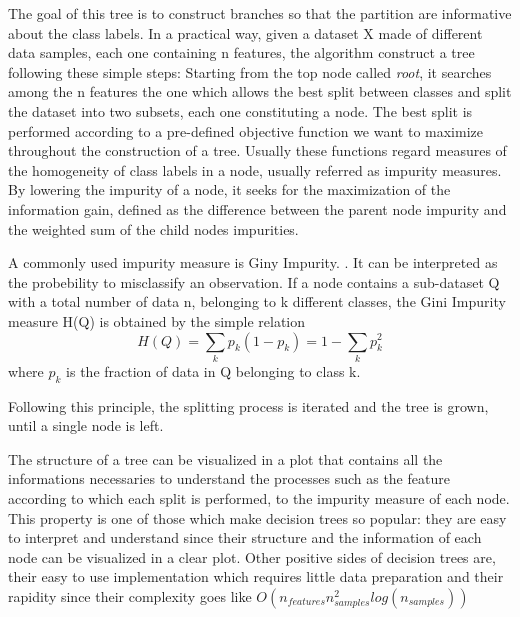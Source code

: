\documentclass[11pt]{report}
\begin{document}
The goal of this tree is to construct branches so that the partition are informative about the class labels.
In a practical way, given a dataset X made of different data samples, each one containing n features, the algorithm construct a tree following these simple steps:
Starting from the top node called \emph{root}, it searches among the n features the one which allows the best split between classes and split the dataset into two subsets, each one constituting a node.
The best split is performed according to a pre-defined objective function we want to maximize throughout the construction of a tree.
Usually these functions regard measures of the homogeneity of class labels in a node, usually referred as impurity measures.
By lowering the impurity of a node, it seeks for the maximization of the information gain, defined as the difference between the parent node impurity and the weighted sum of the child nodes impurities.

A commonly used impurity measure is Giny Impurity. \cite{raschka-2019}.
It can be interpreted as the probebility to misclassify an observation.
If a node contains a sub-dataset Q with a total number of data n, belonging to k different classes, the Gini Impurity measure H(Q) is obtained by the simple relation
\begin{equation}
H(Q)=\sum_k p_{k}(1-p_{k}) = 1- \sum_k p_k^2
\end{equation}
where $p_k$ is the fraction of data in Q belonging to class k.


Following this principle, the splitting process is iterated and the tree is grown, until a single node is left.

The structure of a tree can be visualized in a plot that contains all the informations necessaries to understand the processes such as the feature according to which each split is performed, to the impurity measure of each node.
This property is one of those which make decision trees so popular: they are easy to interpret and understand since their structure and the information of each node can be visualized in a clear plot.
Other positive sides of decision trees are, their easy to use implementation which requires little data preparation and their rapidity since their complexity goes like $O(n_{features}n_{samples}^2log(n_{samples}))$ \cite{scikit-2011}
\end{document}
